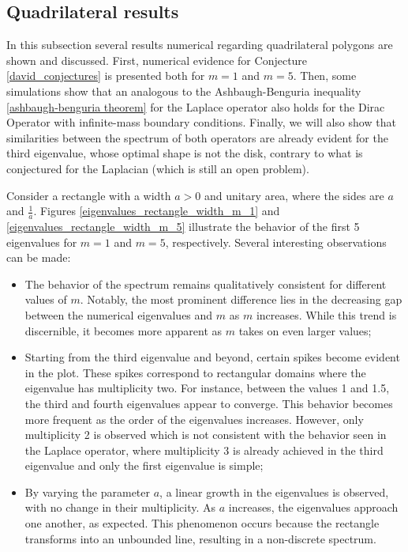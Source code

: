 \subsection{Quadrilateral results}

In this subsection several results numerical regarding quadrilateral polygons are shown and discussed. First, numerical evidence for Conjecture \ref{david_conjectures} is presented both for \(m=1\) and \(m=5\). Then, some simulations show that an analogous to the Ashbaugh-Benguria inequality \ref{ashbaugh-benguria theorem} for the Laplace operator also holds for the Dirac Operator with infinite-mass boundary conditions. Finally, we will also show that similarities between the spectrum of both operators are already evident for the third eigenvalue, whose optimal shape is not the disk, contrary to what is conjectured for the Laplacian (which is still an open problem).

Consider a rectangle with a width \(a > 0\) and unitary area, where the sides are \(a\) and \(\frac{1}{a}\). Figures \ref{eigenvalues_rectangle_width_m_1} and \ref{eigenvalues_rectangle_width_m_5} illustrate the behavior of the first 5 eigenvalues for \(m=1\) and \(m=5\), respectively. Several interesting observations can be made:

\begin{itemize}
  \item The behavior of the spectrum remains qualitatively consistent for different values of \(m\). Notably, the most prominent difference lies in the decreasing gap between the numerical eigenvalues and \(m\) as \(m\) increases. While this trend is discernible, it becomes more apparent as \(m\) takes on even larger values;
  
  \item Starting from the third eigenvalue and beyond, certain spikes become evident in the plot. These spikes correspond to rectangular domains where the eigenvalue has multiplicity two. For instance, between the values 1 and 1.5, the third and fourth eigenvalues appear to converge. This behavior becomes more frequent as the order of the eigenvalues increases. However, only multiplicity 2 is observed which is not consistent with the behavior seen in the Laplace operator, where multiplicity 3 is already achieved in the third eigenvalue and only the first eigenvalue is simple;
  
  \item By varying the parameter \(a\), a linear growth in the eigenvalues is observed, with no change in their multiplicity. As \(a\) increases, the eigenvalues approach one another, as expected. This phenomenon occurs because the rectangle transforms into an unbounded line, resulting in a non-discrete spectrum.
\end{itemize}

